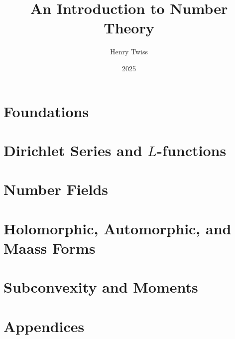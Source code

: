 \documentclass[12pt,oneside]{book}
\title{An Introduction to Number Theory}
\author{Henry Twiss}
\date{2025}
\begin{document}
\maketitle
\pagestyle{empty}
\tableofcontents
\setcounter{page}{0}
\pagestyle{fancy}

\part{Foundations}
  

\part{Dirichlet Series and \texorpdfstring{$L$}{L}-functions}
  
  
  

\part{Number Fields}
  
  
  
  

\part{Holomorphic, Automorphic, and Maass Forms}
  
  
  
  
  

\part{Subconvexity and Moments}
  
  
  

\part{Appendices}
  

\printindex


\end{document}

